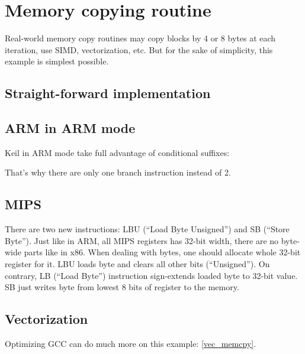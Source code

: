 ﻿\ifx\RUSSIAN\undefined
\section{Memory copying routine}
\label{loop_memcpy}

Real-world memory copy routines may copy blocks by 4 or 8 bytes at each iteration, use \ac{SIMD}, 
vectorization, etc.
But for the sake of simplicity, this example is simplest possible.



\subsection{Straight-forward implementation}



\ifdefined\IncludeARM





\subsection{ARM in ARM mode}

Keil in ARM mode take full advantage of conditional suffixes:



That's why there are only one branch instruction instead of 2.

\fi

\ifdefined\IncludeMIPS
\subsection{MIPS}



There are two new instructions: LBU (``Load Byte Unsigned'') and SB (``Store Byte'').
Just like in ARM, all MIPS registers has 32-bit width, there are no byte-wide parts like in x86.
When dealing with bytes, one should allocate whole 32-bit register for it.
LBU loads byte and clears all other bits (``Unsigned''). 
On contrary, LB (``Load Byte'') instruction sign-extends loaded byte to 32-bit value.
SB just writes byte from lowest 8 bits of register to the memory.

\fi

\subsection{Vectorization}

Optimizing GCC can do much more on this example: \ref{vec_memcpy}.

\fi